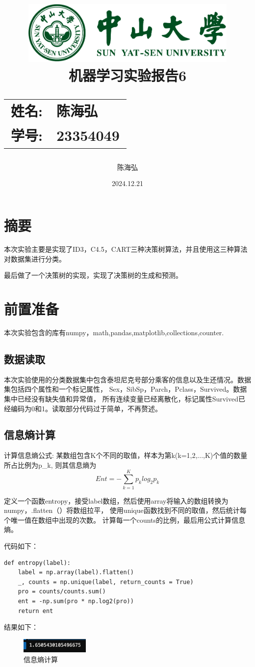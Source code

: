 \documentclass[12pt,a4paper,oneside]{article}
\date{\Large 2024.12.21}
\author{陈海弘}
\title{
    \vspace*{-2cm}
    \includegraphics[width=0.8\textwidth]{SYSULogo.pdf} \\[1em]
    \vfill
    \LARGE \textbf{机器学习实验报告6} \\[1em]
    \Large
    \begin{tabular}{rl}
        \textbf{姓名:} & \textbf{陈海弘} \\
        \textbf{学号:} & \textbf{23354049}
    \end{tabular}
    \vfill
}
\begin{document}
\maketitle
\newpage
\tableofcontents
\newpage
\section{摘要}
\qquad 本次实验主要是实现了ID3，C4.5，CART三种决策树算法，并且使用这三种算法对数据集进行分类。

最后做了一个决策树的实现，实现了决策树的生成和预测。
\section{前置准备}
本次实验包含的库有numpy，math,pandas,matplotlib,collections,counter.
\subsection{数据读取}
\qquad 本次实验使用的分类数据集中包含泰坦尼克号部分乘客的信息以及生还情况。数据集包括四个属性和一个标记属性，
Sex，SibSp，Parch，Pclass，Survived。数据集中已经没有缺失值和异常值，
所有连续变量已经离散化，标记属性Survived已经编码为0和1。读取部分代码过于简单，不再赘述。

\subsection{信息熵计算}
\qquad 计算信息熵公式:
某数组包含K个不同的取值，样本为第k(k=1,2,...,K)个值的数量所占比例为p\_k,
则其信息熵为$$Ent=-\sum_{k=1}^K p_k log_2 p_k$$

定义一个函数entropy，接受label数组，然后使用array将输入的数组转换为numpy，.flatten（）将数组拉平，
使用unique函数找到不同的取值，然后统计每个唯一值在数组中出现的次数。
计算每一个counts的比例，最后用公式计算信息熵。

代码如下：
\begin{lstlisting}
def entropy(label):
    label = np.array(label).flatten()
    _, counts = np.unique(label, return_counts = True)
    pro = counts/counts.sum()
    ent = -np.sum(pro * np.log2(pro))
    return ent
\end{lstlisting}


结果如下：
\begin{figure}[H]
    \centering
    \includegraphics[width=0.3\textwidth]{image/1.png}
    \caption{信息熵计算}
\end{figure}
\end{document}
